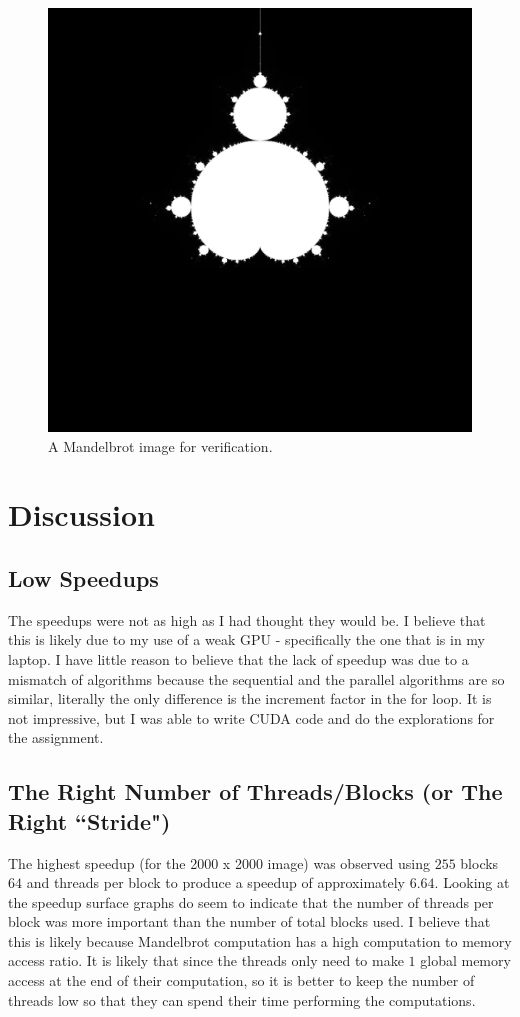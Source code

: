 \documentclass{article}
\begin{document}
  \begin{figure}[h!]
    \centering
    \includegraphics[width=.7\linewidth]{testimage}
    \caption{A Mandelbrot image for verification.}
    \label{fig:total_speedup}
  \end{figure}

\newpage
\section{Discussion}
\subsection{Low Speedups}
The speedups were not as high as I had thought they would be. I believe that this is likely due to my use of a weak GPU - specifically the one that is in my laptop. I have little reason to believe that the lack of speedup was due to a mismatch of algorithms because the sequential and the parallel algorithms are so similar, literally the only difference is the increment factor in the for loop. It is not impressive, but I was able to write CUDA code and do the explorations for the assignment.

\subsection{The Right Number of Threads/Blocks (or The Right ``Stride")}
The highest speedup (for the 2000 x 2000 image) was observed using $255$ blocks $64$ and threads per block to produce a speedup of approximately $6.64$. Looking at the speedup surface graphs do seem to indicate that the number of threads per block was more important than the number of total blocks used. I believe that this is likely because Mandelbrot computation has a high computation to memory access ratio. It is likely that since the threads only need to make $1$ global memory access at the end of their computation, so it is better to keep the number of threads low so that they can spend their time performing the computations.
\end{document}
